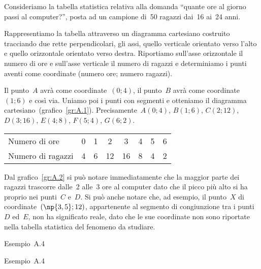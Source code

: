 \begin{exrig}
 \begin{esempio}

Consideriamo la tabella statistica relativa alla domanda ``quante ore al giorno passi al computer?'', posta ad un
campione di~50 ragazzi dai~16 ai~24 anni.

Rappresentiamo la tabella attraverso un diagramma cartesiano costruito tracciando due rette perpendicolari, gli assi, quello verticale orientato verso
l'alto e quello orizzontale orientato verso destra. Riportiamo sull'asse orizzontale il numero di ore e sull'asse verticale il numero di ragazzi e determiniamo
i punti aventi come coordinate (numero ore; numero ragazzi).

Il punto~$A$ avrà come coordinate~$(0;4)$, il punto~$B$ avrà come coordinate~$(1;6)$ e così via. Uniamo poi
i punti con segmenti e otteniamo il diagramma cartesiano~(grafico~\ref{gr:A.1}).
Precisamente~$A(0;4)$, $B(1;6)$, $C(2;12)$, $D(3;16)$, $E(4;8)$, $F(5;4)$, $G(6;2)$.

\begin{center}
\begin{tabular}{lccccccc}
\toprule
Numero di ore & 0 & 1 &2 & 3 & 4 & 5 & 6\\
Numero di ragazzi & 4 & 6 & 12 & 16 & 8 & 4 & 2 \\
\bottomrule
\end{tabular}
\end{center}
Dal grafico~\ref{gr:A.2} si può notare immediatamente che la maggior parte dei ragazzi trascorre dalle~2 alle~3 ore al computer dato che il picco più
alto si ha proprio nei punti~$C$ e~$D$.
Si può anche notare che, ad esempio, il punto~$X$ di coordinate~$(\np{3,5};12)$, appartenente al segmento di congiunzione tra i punti~$D$ ed~$E$,
non ha significato reale, dato che le sue coordinate non sono riportate nella tabella statistica del fenomeno da studiare.
\begin{grafico}[t]
\begin{minipage}{0.5\textwidth}

\caption{Esempio~A.4}\label{gr:A.1}
\end{minipage}\hfill
\begin{minipage}{0.5\textwidth}

\caption{Esempio~A.4}\label{gr:A.2}
\end{minipage}
\end{grafico}
\end{esempio}
\end{exrig}

